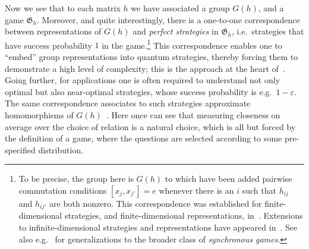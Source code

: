 \documentclass[11pt]{article}
\theoremstyle{definition}
\newcommand{\eps}{\varepsilon}
\newcommand{\game}{\mathfrak{G}}
\begin{document}
Now we see that to each matrix $h$ we have associated a group $G(h)$, and a game $\game_h$. Moreover, and quite interestingly, there is a one-to-one correspondence between representations of $G(h)$ and \emph{perfect strategies} in $\game_h$, i.e.\ strategies that have success probability $1$ in the game.\footnote{To be precise, the group here is $G(h)$ to which have been added pairwise commutation conditions $[x_j,x_{j'}]=e$ whenever there is an $i$ such that $h_{ij}$ and $h_{ij'}$ are both nonzero. This correspondence was established for finite-dimensional strategies, and finite-dimensional representations, in~\cite{cleve2014characterization}. Extensions to infinite-dimensional strategies and representations have appeared in~\cite{cleve2017perfect}. See also e.g.~\cite{kim2018synchronous} for generalizations to the broader class of \emph{synchronous games}.}
This correspondence enables one to ``embed'' group representations into quantum strategies, thereby forcing them to demonstrate a high level of complexity; this is the approach at the heart of~\cite{slofstra2019set}. Going further, for applications one is often required to understand not only optimal but also near-optimal strategies, whose success probability is e.g.\ $1-\eps$. The same correspondence associates to such strategies approximate homomorphisms of $G(h)$~\cite{slofstra2018entanglement}. Here once can see that measuring closeness on average over the choice of relation is a natural choice, which is all but forced by the definition of a game, where the questions are selected according to some pre-specified distribution. 
\end{document}
